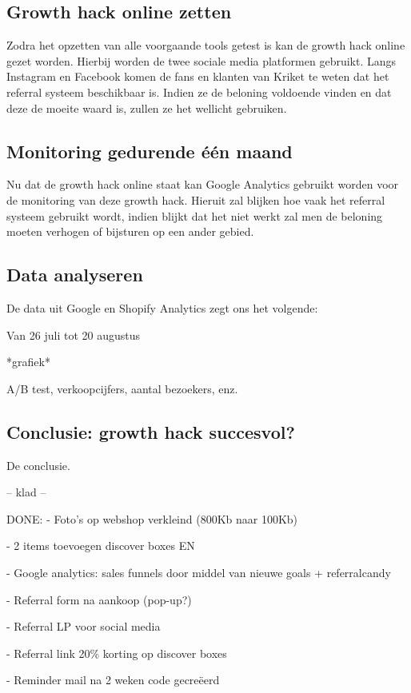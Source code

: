 \subsection{Growth hack online zetten} \label{sec:growth-hack-online-zetten}
Zodra het opzetten van alle voorgaande tools getest is kan de growth hack online gezet worden. Hierbij worden de twee sociale media platformen gebruikt. Langs Instagram en Facebook komen de fans en klanten van Kriket te weten dat het referral systeem beschikbaar is. Indien ze de beloning voldoende vinden en dat deze de moeite waard is, zullen ze het wellicht gebruiken. 

\subsection{Monitoring gedurende één maand} \label{sec:monitoring-gedurende-twee-weken}
Nu dat de growth hack online staat kan Google Analytics gebruikt worden voor de monitoring van deze growth hack. Hieruit zal blijken hoe vaak het referral systeem gebruikt wordt, indien blijkt dat het niet werkt zal men de beloning moeten verhogen of bijsturen op een ander gebied.

\subsection{Data analyseren} \label{sec:data-analyseren}
De data uit Google en Shopify Analytics zegt ons het volgende:

Van 26 juli tot 20 augustus

*grafiek*

A/B test, verkoopcijfers, aantal bezoekers, enz.



\subsection{Conclusie: growth hack succesvol?} \label{sec:conclusie-growth-hack-succesvol}
De conclusie.


-- klad --

DONE:
- Foto's op webshop verkleind (800Kb naar 100Kb)

- 2 items toevoegen discover boxes EN

- Google analytics: sales funnels door middel van nieuwe goals + referralcandy

- Referral form na aankoop (pop-up?)

- Referral LP voor social media 

- Referral link 20\% korting op discover boxes

- Reminder mail na 2 weken code gecreëerd
